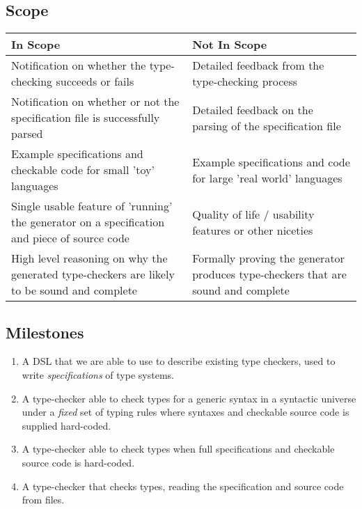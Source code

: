   \subsection{Scope}

  \begin{center}
  \begin{tabular}{p{20em}|p{18em}}
    \large In Scope & \large Not In Scope \\ \hline \hline
    Notification on whether the type-checking succeeds
    or fails
    & Detailed feedback from the type-checking process \\ \hline
    Notification on whether or not the specification file is
    successfully parsed
    & Detailed feedback on the parsing of the specification file \\ \hline
    Example specifications and checkable code for small 'toy' languages
    & Example specifications and code for large 'real world' languages \\ \hline
    Single usable feature of 'running' the generator on a
    specification and piece of source code
    & Quality of life / usability features or other niceties \\ \hline
    High level reasoning on why the generated type-checkers
    are likely to be sound and complete
    & Formally proving the generator produces type-checkers
    that are sound and complete\\
  \end{tabular}            
  \end{center}        
  
  \subsection{Milestones}

  \begin{enumerate}
  \item A DSL that we are able to use to describe existing
    type checkers, used to write \emph{specifications} of type systems.
  \item A type-checker able to check types for a generic syntax
    in a syntactic universe under a \emph{fixed} set of typing rules
    where syntaxes and checkable source code is supplied hard-coded.
  \item A type-checker able to check types when full specifications
    and checkable source code is hard-coded.
  \item A type-checker  that checks types, reading
    the specification and source code from files.
  \end{enumerate}
  
